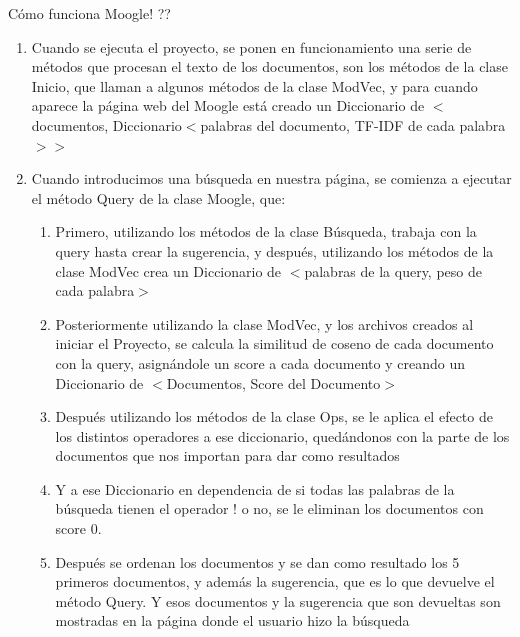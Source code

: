 \documentclass[12pt, a4paper]{article}
\begin{document}
Cómo funciona Moogle! ??

\begin{enumerate}
      \item Cuando se ejecuta el proyecto, se ponen en funcionamiento una serie de métodos que procesan el texto de los documentos, 
            son los métodos de la clase Inicio, que llaman a algunos métodos de la clase ModVec, 
            y para cuando aparece la página web del Moogle está creado un Diccionario de
            $<$documentos, Diccionario$<$palabras del documento, TF-IDF de cada palabra$>>$
      \item Cuando introducimos una búsqueda en nuestra página, se comienza a ejecutar el método Query de la clase Moogle, que:
            \begin{enumerate}
                  \item Primero, utilizando los métodos de la clase Búsqueda, trabaja con
                        la query hasta crear la sugerencia,  y después, utilizando los métodos
                        de la clase ModVec crea un Diccionario de
                        $<$palabras de la query, peso de cada palabra$>$
                  \item Posteriormente utilizando la clase ModVec, y los archivos creados al iniciar el Proyecto, 
                  se calcula la similitud de coseno de cada documento con la query, asignándole un score a cada documento y 
                  creando un Diccionario de $<$Documentos, Score del Documento$>$
                  \item Después utilizando los métodos de la clase Ops,
                        se le aplica el efecto de los distintos operadores a ese
                        diccionario, quedándonos con la parte de los documentos
                        que nos importan para dar como resultados
                  \item Y a ese Diccionario en dependencia de si todas las palabras de la búsqueda tienen el operador ! o no, 
                        se le eliminan los documentos con score 0.
                  \item Después se ordenan los documentos y se dan como resultado los 5 primeros documentos, y además la sugerencia, 
                        que es lo que devuelve el método Query.
                        Y esos documentos y la sugerencia que son devueltas son mostradas en la página donde el usuario hizo la búsqueda
                  
            \end{enumerate}

\end{enumerate}
\end{document}

